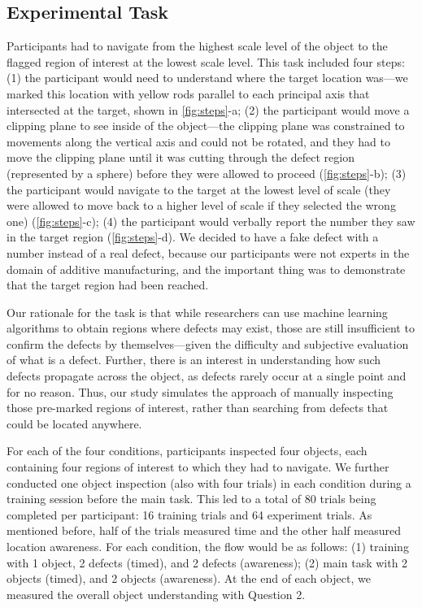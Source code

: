 \subsection{Experimental Task}
Participants had to navigate from the highest scale level of the object to the flagged region of interest at the lowest scale level. This task included four steps: (1) the participant would need to understand where the target location was---we marked this location with yellow rods parallel to each principal axis that intersected at the target, shown in \autoref{fig:steps}-a; (2) the participant would move a clipping plane to see inside of the object---the clipping plane was constrained to movements along the vertical axis and could not be rotated, and they had to move the clipping plane until it was cutting through the defect region (represented by a sphere) before they were allowed to proceed (\autoref{fig:steps}-b); (3) the participant would navigate to the target at the lowest level of scale (they were allowed to move back to a higher level of scale if they selected the wrong one) (\autoref{fig:steps}-c); (4) the participant would verbally report the number they saw in the target region (\autoref{fig:steps}-d). We decided to have a fake defect with a number instead of a real defect, because our participants were not experts in the domain of additive manufacturing, and the important thing was to demonstrate that the target region had been reached.

Our rationale for the task is that while researchers can use machine learning algorithms to obtain regions where defects may exist, those are still insufficient to confirm the defects by themselves---given the difficulty and subjective evaluation of what is a defect. Further, there is an interest in understanding how such defects propagate across the object, as defects rarely occur at a single point and for no reason. Thus, our study simulates the approach of manually inspecting those pre-marked regions of interest, rather than searching from defects that could be located anywhere.

For each of the four conditions, participants inspected four objects, each containing four regions of interest to which they had to navigate. We further conducted one object inspection (also with four trials) in each condition during a training session before the main task. This led to a total of 80 trials being completed per participant: 16 training trials and 64 experiment trials. As mentioned before, half of the trials measured time and the other half measured location awareness. For each condition, the flow would be as follows: (1) training with 1 object, 2 defects (timed), and 2 defects (awareness); (2) main task with 2 objects (timed), and 2 objects (awareness). At the end of each object, we measured the overall object understanding with Question 2.

